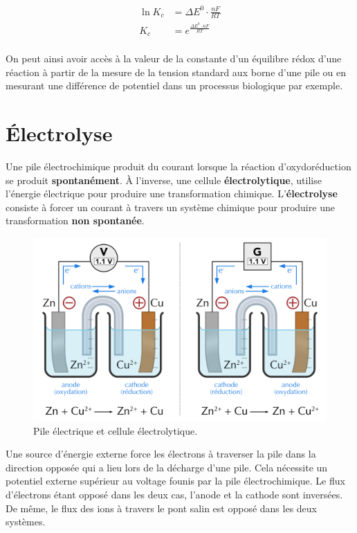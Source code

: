 \documentclass[
  11pt,
  a4paper,
  openany]{book}
\begin{document}
\[
\begin{split}
\ln{K_{c}} &= \Delta E^{0} \cdot \frac{nF}{RT} \\
K_{c} &= e^{\frac{\Delta E^{0}\cdot nF}{RT}} \\
\end{split}
\]

On peut ainsi avoir accès à la valeur de la constante d'un équilibre rédox d'une réaction à partir de la mesure de la tension standard aux borne d'une pile ou en mesurant une différence de potentiel dans un processus biologique par exemple.


\clearpage

\section{Électrolyse}\label{uxe9lectrolyse}

Une pile électrochimique produit du courant lorsque la réaction d'oxydoréduction se produit \textbf{spontanément}. À l'inverse, une cellule \textbf{électrolytique}, utilise l'énergie électrique pour produire une transformation chimique. L'\textbf{électrolyse} consiste à forcer un courant à travers un système chimique pour produire une transformation \textbf{non spontanée}.

\begin{figure}

{\centering \includegraphics[width=0.67\linewidth]{images/pile-recharge} 

}

\caption{Pile électrique et cellule électrolytique.}\label{fig:pile-recharge}
\end{figure}

Une source d'énergie externe force les électrons à traverser la pile dans la direction opposée qui a lieu lors de la décharge d'une pile. Cela nécessite un potentiel externe supérieur au voltage founis par la pile électrochimique. Le flux d'électrons étant opposé dans les deux cas, l'anode et la cathode sont inversées. De même, le flux des ions à travers le pont salin est opposé dans les deux systèmes.
\end{document}
